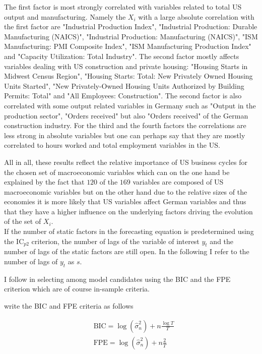 \documentclass[12pt]{article}
\begin{document}
The first factor is most strongly correlated with variables related to total US output and manufacturing. Namely the $X_i$ with a large absolute correlation with the first factor are "Industrial Production Index", "Industrial Production: Durable Manufacturing (NAICS)", "Industrial Production: Manufacturing (NAICS)", "ISM Manufacturing: PMI Composite Index", "ISM Manufacturing Production Index" and "Capacity Utilization: Total Industry".
The second factor mostly affects variables dealing with US construction and private housing: "Housing Starts in Midwest Census Region", "Housing Starts: Total: New Privately Owned Housing Units Started", "New Privately-Owned Housing Units Authorized by Building Permits: Total" and "All Employees: Construction". The second factor is also correlated with some output related variables in Germany such as "Output in the production sector", "Orders received" but also "Orders received" of the German construction industry.
For the third and the fourth factors the correlations are less strong in absolute variables but one can perhaps say that they are mostly correlated to hours worked and total employment variables in the US. 

All in all, these results reflect the relative importance of US business cycles for the chosen set of macroeconomic variables which can on the one hand be explained by the fact that $120$ of the $169$ variables are composed of US macroeconomic variables but on the other hand due to the relative sizes of the economies it is more likely that US variables affect German variables and thus that they have a higher influence on the underlying factors driving the evolution of the set of $X_i$. \\


If the number of static factors in the forecasting equation is predetermined using the IC$_{p2}$ criterion, the number of lags of the variable of interest $y_t$ and the number of lags of the static factors are still open. In the following I refer to the number of lags of $y_t$ as $s$. 

I follow \citet{bai2008forecasting} in selecting among model candidates using the BIC and the FPE criterion which are of course in-sample criteria. 

\citet{bai2008forecasting} write the BIC and FPE criteria as follows

\begin{equation}
\label{information criteria}
\begin{split}
	& \text{BIC} = \log(\hat \sigma_n^2) + n \frac{\log T}{T} \\ 
	& \text{FPE} = \log(\hat \sigma_n^2) + n \frac{2}{T}
\end{split}
\end{equation}
\end{document}
